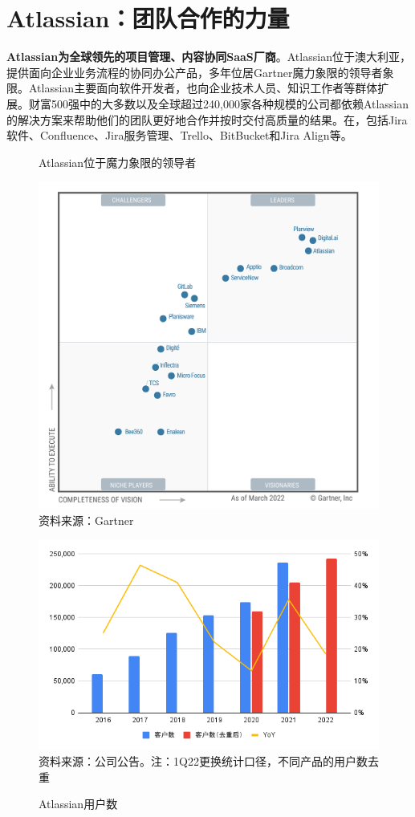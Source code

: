 \section{Atlassian：团队合作的力量}

\textbf{Atlassian为全球领先的项目管理、内容协同SaaS厂商}。Atlassian位于澳大利亚，提供面向企业业务流程的协同办公产品，多年位居Gartner魔力象限的领导者象限。Atlassian主要面向软件开发者，也向企业技术人员、知识工作者等群体扩展。财富500强中的大多数以及全球超过240,000家各种规模的公司都依赖Atlassian的解决方案来帮助他们的团队更好地合作并按时交付高质量的结果。在，包括Jira软件、Confluence、Jira服务管理、Trello、BitBucket和Jira Align等。
\begin{figure}[H]
    \centering
    \begin{minipage}{0.38\linewidth}
        \caption{Atlassian位于魔力象限的领导者}
        \includegraphics[width=\linewidth]{img/gartner.png}
        \footnotesize{资料来源：Gartner}
    \end{minipage}
    \begin{minipage}{0.58\linewidth}
        \caption{Atlassian用户数}
        \includegraphics[width=\linewidth]{img/customers.png}
        \footnotesize{资料来源：公司公告。注：1Q22更换统计口径，不同产品的用户数去重}
    \end{minipage}
\end{figure}

